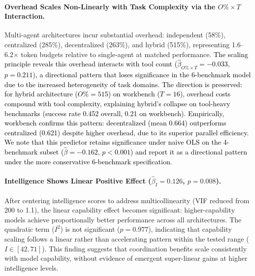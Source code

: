 \paragraph{Overhead Scales Non-Linearly with Task Complexity via the $O\% \times T$ Interaction.}
Multi-agent architectures incur substantial overhead: independent (58\%), centralized (285\%), decentralized (263\%), and hybrid (515\%), representing 1.6--6.2$\times$ token budgets relative to single-agent at matched performance. \textcolor{black}{The scaling principle reveals this overhead interacts with tool count ($\hat{\beta}_{O\% \times T} = -0.033$, $p = 0.211$), a directional pattern that loses significance in the 6-benchmark model due to the increased heterogeneity of task domains. The direction is preserved: for hybrid architecture ($O\% = 515$) on workbench ($T = 16$), overhead costs compound with tool complexity, explaining hybrid's collapse on tool-heavy benchmarks (success rate 0.452 overall, 0.21 on workbench). Empirically, workbench confirms this pattern: decentralized (mean 0.664) outperforms centralized (0.621) despite higher overhead, due to its superior parallel efficiency. We note that this predictor retains significance under naive OLS on the 4-benchmark subset ($\hat{\beta} = -0.162$, $p < 0.001$) and report it as a directional pattern under the more conservative 6-benchmark specification.}

\paragraph{Intelligence Shows Linear Positive Effect ($\hat{\beta}_{I} = 0.126$, $p = 0.008$).}
After centering intelligence scores to address multicollinearity (VIF reduced from 200 to 1.1), the linear capability effect becomes significant: higher-capability models achieve proportionally better performance across all architectures. The quadratic term ($I^2$) is not significant ($p = 0.977$), indicating that capability scaling follows a linear rather than accelerating pattern within the tested range ($I \in [42, 71]$). This finding suggests that coordination benefits scale consistently with model capability, without evidence of emergent super-linear gains at higher intelligence levels.


